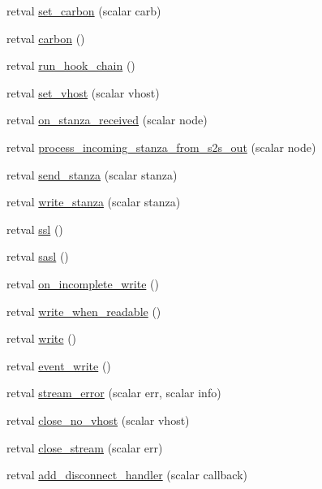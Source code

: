 \begin{Indent}
\begin{DoxyCompactItemize}
\item 
retval \hyperlink{class_d_jabberd_1_1_connection_a7566c2d6473bf8744372e942036c348c}{set\-\_\-carbon} (scalar carb)
\item 
retval \hyperlink{class_d_jabberd_1_1_connection_af8d1ca6c130e8aa67084effd85aab4b6}{carbon} ()
\item 
retval \hyperlink{class_d_jabberd_1_1_connection_af2f53e4524c091ae2072fbd1b5a7c0e3}{run\-\_\-hook\-\_\-chain} ()
\item 
retval \hyperlink{class_d_jabberd_1_1_connection_abb914c19b39f6b70f59e7af11fab5db1}{set\-\_\-vhost} (scalar vhost)
\item 
retval \hyperlink{class_d_jabberd_1_1_connection_a0458c9ae427b63840d6220f178631bc8}{on\-\_\-stanza\-\_\-received} (scalar node)
\item 
retval \hyperlink{class_d_jabberd_1_1_connection_a9d756fb0ea7ba97c48724ec4d34e23b6}{process\-\_\-incoming\-\_\-stanza\-\_\-from\-\_\-s2s\-\_\-out} (scalar node)
\item 
retval \hyperlink{class_d_jabberd_1_1_connection_a9b3ede81a6f6e218144fd96e9af46fc8}{send\-\_\-stanza} (scalar stanza)
\item 
retval \hyperlink{class_d_jabberd_1_1_connection_a15673b5e1abcde591e2f11c1dda3bb83}{write\-\_\-stanza} (scalar stanza)
\item 
retval \hyperlink{class_d_jabberd_1_1_connection_aa844e67e8b5949a89c71774aa5104a0f}{ssl} ()
\item 
retval \hyperlink{class_d_jabberd_1_1_connection_a252816c54bfe80800fa4efcaef2e7ebd}{sasl} ()
\item 
retval \hyperlink{class_d_jabberd_1_1_connection_adc2637c765ac6c7963be969aaccf8a14}{on\-\_\-incomplete\-\_\-write} ()
\item 
retval \hyperlink{class_d_jabberd_1_1_connection_ac8daeea408788a2c38c76a972ffec5ac}{write\-\_\-when\-\_\-readable} ()
\item 
retval \hyperlink{class_d_jabberd_1_1_connection_a4c9ebbfb4790deafa6e4882af8bd8ddc}{write} ()
\item 
retval \hyperlink{class_d_jabberd_1_1_connection_a755aed2cff949bfd9f4fb9c28e87fea0}{event\-\_\-write} ()
\item 
retval \hyperlink{class_d_jabberd_1_1_connection_a77651612edbf51f20312a3c1f7769bfe}{stream\-\_\-error} (scalar err, scalar info)
\item 
retval \hyperlink{class_d_jabberd_1_1_connection_a2640089a6ba7e45fd49e20d243b0cdd7}{close\-\_\-no\-\_\-vhost} (scalar vhost)
\item 
retval \hyperlink{class_d_jabberd_1_1_connection_a4330afd9b80a28b8973024c94d781785}{close\-\_\-stream} (scalar err)
\item 
retval \hyperlink{class_d_jabberd_1_1_connection_a925785b4f273c531cbecf342461e8f1a}{add\-\_\-disconnect\-\_\-handler} (scalar callback)
\end{DoxyCompactItemize}
\end{Indent}
